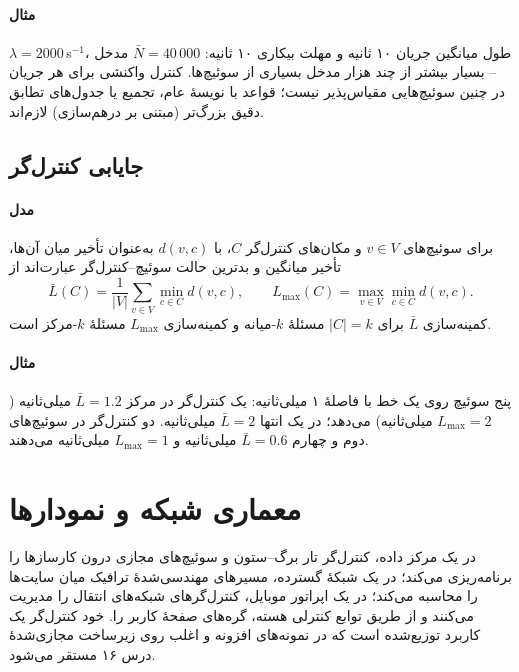 \documentclass[11pt,a4paper]{article}
\begin{document}
\paragraph{مثال} $\lambda = 2000$\,s$^{-1}$، طول میانگین جریان ۱۰ ثانیه و مهلت بیکاری ۱۰ ثانیه: $\bar N = 40\,000$ مدخل --
بسیار بیشتر از چند هزار مدخل  بسیاری از سوئیچ‌ها. کنترل واکنشی برای هر جریان در چنین سوئیچ‌هایی مقیاس‌پذیر
نیست؛ قواعد با نویسهٔ عام، تجمیع یا جدول‌های تطابق دقیق بزرگ‌تر (مبتنی بر درهم‌سازی) لازم‌اند.

\subsection{جایابی کنترل‌گر}\label{sec:place}
\paragraph{مدل} برای سوئیچ‌های $v\in V$ و مکان‌های کنترل‌گر $C$، با $d(v,c)$ به‌عنوان تأخیر میان آن‌ها، تأخیر میانگین و بدترین
حالت سوئیچ--کنترل‌گر عبارت‌اند از
\begin{equation}\label{eq:place}
  \bar L(C) = \frac{1}{|V|}\sum_{v\in V}\min_{c\in C} d(v,c), \qquad
  L_{\max}(C) = \max_{v\in V}\min_{c\in C} d(v,c).
\end{equation}
کمینه‌سازی $\bar L$ برای $|C| = k$ مسئلهٔ $k$-میانه و کمینه‌سازی $L_{\max}$ مسئلهٔ $k$-مرکز است.
\paragraph{مثال} پنج سوئیچ روی یک خط با فاصلهٔ ۱ میلی‌ثانیه: یک کنترل‌گر در مرکز $\bar L = 1.2$ میلی‌ثانیه ($L_{\max} = 2$
میلی‌ثانیه) می‌دهد؛ در یک انتها $\bar L = 2$ میلی‌ثانیه. دو کنترل‌گر در سوئیچ‌های دوم و چهارم $\bar L = 0.6$ میلی‌ثانیه و
$L_{\max} = 1$ میلی‌ثانیه می‌دهند.

\section{معماری شبکه و نمودارها}
در یک مرکز داده، کنترل‌گر  تار برگ--ستون و سوئیچ‌های مجازی درون کارسازها را برنامه‌ریزی می‌کند؛ در یک شبکهٔ گسترده،
مسیرهای مهندسی‌شدهٔ ترافیک میان سایت‌ها را محاسبه می‌کند؛ در یک اپراتور موبایل، کنترل‌گرهای  شبکه‌های انتقال را
مدیریت می‌کنند و از طریق توابع کنترلی هسته، گره‌های صفحهٔ کاربر را. خود کنترل‌گر یک کاربرد توزیع‌شده است که در نمونه‌های
افزونه و اغلب روی زیرساخت مجازی‌شدهٔ درس ۱۶ مستقر می‌شود.
\end{document}
